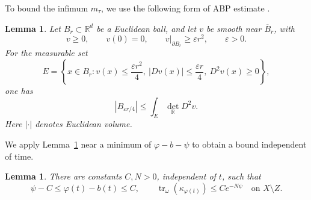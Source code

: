 \documentclass[reqno]{amsart}
\numberwithin{equation}{section}
\newtheorem{lemma}[theorem]{Lemma}
\theoremstyle{definition}
\DeclareMathOperator{\tr}{tr}
\begin{document}
To bound the infimum $m_\tau$, we use the following form of ABP estimate \cite[Proposition~11]{S18}. 
\begin{lemma}
\label{lem:contact-volume}
Let $B_r\subset\mathbb R^d$ be a Euclidean ball, and let
$v$ be smooth near $\overline B_r$, with
\[
 v\ge0,\qquad v(0)=0,\qquad
 v|_{\partial B_r}\ge\varepsilon r^2,\qquad \varepsilon>0.
\]
For the measurable set
\[
 E=\left\{x\in B_r:
 v(x)\le\frac{\varepsilon r^2}{4},\
 |Dv(x)|\le\frac{\varepsilon r}{4},\
 D^2v(x)\ge0\right\},
\]
one has
\begin{equation}\label{eq:contact-volume}
 |B_{\varepsilon r/4}|
       \le\int_E\det_{\mathbb R}D^2v.
\end{equation}
Here $|\cdot|$ denotes Euclidean volume.
\end{lemma}

We apply Lemma~\ref{lem:contact-volume} near a minimum of
$\varphi-b-\psi$ to obtain a bound independent of time.
\begin{lemma}\label{lem:flow-potential}
There are constants $C,N>0$,
independent of $t$, such that
\begin{equation}\label{eq:flow-potential}
 \psi-C\le\varphi(t)-b(t)\le C,\qquad
 \tr_\omega(\kappa_{\varphi(t)})\le Ce^{-N\psi}
 \quad\text{on }X\setminus Z.
\end{equation}
\end{lemma}
\end{document}
